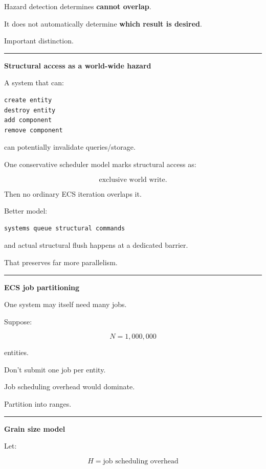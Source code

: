 Hazard detection determines \textbf{cannot overlap}.

It does not automatically determine \textbf{which result is desired}.

Important distinction.

\begin{center}\rule{0.5\linewidth}{0.5pt}\end{center}

\textbf{Structural access as a world-wide hazard}

A system that can:

\begin{verbatim}
create entity
destroy entity
add component
remove component
\end{verbatim}

can potentially invalidate queries/storage.

One conservative scheduler model marks structural access as:

\[
\text{exclusive world write}.
\]

Then no ordinary ECS iteration overlaps it.

Better model:

\begin{verbatim}
systems queue structural commands
\end{verbatim}

and actual structural flush happens at a dedicated barrier.

That preserves far more parallelism.

\begin{center}\rule{0.5\linewidth}{0.5pt}\end{center}

\textbf{ECS job partitioning}

One system may itself need many jobs.

Suppose:

\[
N=1,000,000
\]

entities.

Don't submit one job per entity.

Job scheduling overhead would dominate.

Partition into ranges.

\begin{center}\rule{0.5\linewidth}{0.5pt}\end{center}

\textbf{Grain size model}

Let:

\[
H=
\text{job scheduling overhead}
\]

